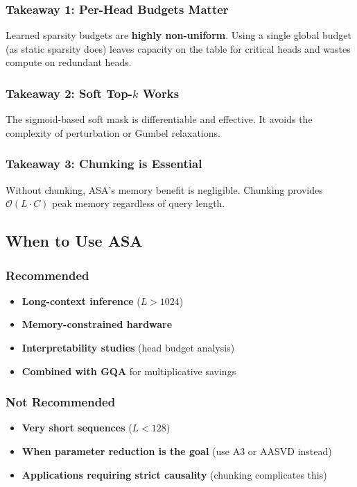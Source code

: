\subsubsection{Takeaway 1: Per-Head Budgets Matter}

Learned sparsity budgets are \textbf{highly non-uniform}. Using a single global 
budget (as static sparsity does) leaves capacity on the table for critical 
heads and wastes compute on redundant heads.

\subsubsection{Takeaway 2: Soft Top-$k$ Works}

The sigmoid-based soft mask is differentiable and effective. It avoids 
the complexity of perturbation or Gumbel relaxations.

\subsubsection{Takeaway 3: Chunking is Essential}

Without chunking, ASA's memory benefit is negligible. Chunking provides 
$\mathcal{O}(L \cdot C)$ peak memory regardless of query length.

\subsection{When to Use ASA}

\subsubsection{Recommended}

\begin{itemize}
\item \textbf{Long-context inference} ($L > 1024$)
\item \textbf{Memory-constrained hardware}
\item \textbf{Interpretability studies} (head budget analysis)
\item \textbf{Combined with GQA} for multiplicative savings

\end{itemize}
\subsubsection{Not Recommended}

\begin{itemize}
\item \textbf{Very short sequences} ($L < 128$)
\item \textbf{When parameter reduction is the goal} (use A3 or AASVD instead)
\item \textbf{Applications requiring strict causality} (chunking complicates this)

\end{itemize}
